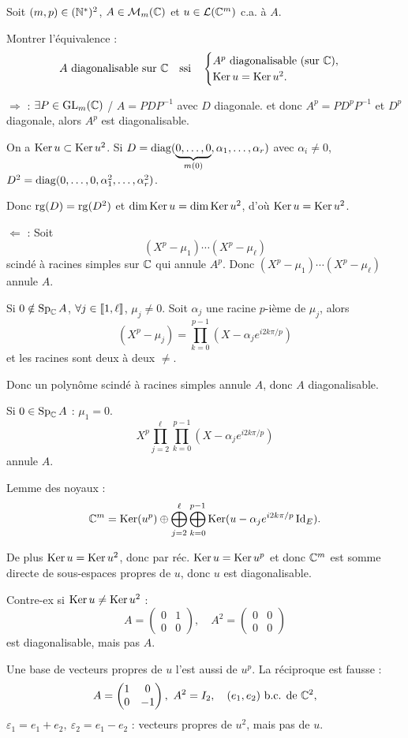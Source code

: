 
\begin{statementbox}
Soit $(m,p)\in(\mathbb N^*)^2$, $A\in\mathcal M_m(\mathbb C)$ et $u\in\mathcal L(\mathbb C^m)$ c.a. à $A$.

Montrer l'équivalence :
\[
A\text{ diagonalisable sur }\mathbb C
\quad\text{ssi}\quad
\begin{cases}
A^p\text{ diagonalisable (sur }\mathbb C),\\
\operatorname{Ker} u=\operatorname{Ker} u^2.
\end{cases}
\]
\end{statementbox}

\begin{solution}
$\Rightarrow$ : $\exists P\in\operatorname{GL}_m(\mathbb C)$ / $A=PDP^{-1}$ avec $D$ diagonale.
et donc $A^p=PD^pP^{-1}$ et $D^p$ diagonale, alors $A^p$ est diagonalisable.

On a $\operatorname{Ker} u\subset\operatorname{Ker} u^2$.
Si $D=\operatorname{diag}(\underbrace{0,\dots,0}_{m(0)},\alpha_1,\dots,\alpha_r)$ avec
$\alpha_i\neq0$, $D^2=\operatorname{diag}(0,\dots,0,\alpha_1^2,\dots,\alpha_r^2)$.

Donc $\operatorname{rg}(D)=\operatorname{rg}(D^2)$ et $\dim\operatorname{Ker} u=\dim\operatorname{Ker} u^2$, d'où
$\operatorname{Ker} u=\operatorname{Ker} u^2$.

$\Leftarrow$ : Soit
\[
(X^p-\mu_1)\cdots(X^p-\mu_\ell)
\]
scindé à racines simples sur $\mathbb C$ qui annule $A^p$.
Donc $(X^p-\mu_1)\cdots(X^p-\mu_\ell)$ annule $A$.

Si $0\notin\operatorname{Sp}_\mathbb C A$, $\forall j\in\llbracket 1,\ell\rrbracket$, $\mu_j\neq0$.
Soit $\alpha_j$ une racine $p$-ième de $\mu_j$, alors
\[
(X^p-\mu_j)=\prod_{k=0}^{p-1}(X-\alpha_j e^{i2k\pi/p})
\]
et les racines sont deux à deux $\neq$.

Donc un polynôme scindé à racines simples annule $A$, donc $A$ diagonalisable.

Si $0\in\operatorname{Sp}_\mathbb C A$ : $\mu_1=0$.
\[
X^p\prod_{j=2}^{\ell}\prod_{k=0}^{p-1}
(X-\alpha_j e^{i2k\pi/p})
\]
annule $A$.

Lemme des noyaux :
\[
\mathbb C^m=\operatorname{Ker}(u^p)\oplus
\bigoplus_{j=2}^{\ell}\bigoplus_{k=0}^{p-1}
\operatorname{Ker}(u-\alpha_je^{i2k\pi/p}\operatorname{Id}_E).
\]

De plus $\operatorname{Ker} u=\operatorname{Ker} u^2$, donc par réc. $\operatorname{Ker} u=\operatorname{Ker} u^p$ et donc $\mathbb C^m$ est
somme directe de sous-espaces propres de $u$, donc $u$ est diagonalisable.

Contre-ex si $\operatorname{Ker} u\neq\operatorname{Ker} u^2$ :
\[
A=\begin{pmatrix}0&1\\0&0\end{pmatrix},\quad
A^2=\begin{pmatrix}0&0\\0&0\end{pmatrix}
\]
est diagonalisable, mais pas $A$.

\begin{remarkbox}
Une base de vecteurs propres de $u$ l'est aussi de $u^p$.
La réciproque est fausse :
\[
A=\begin{pmatrix}1&0\\0&-1\end{pmatrix},\ A^2=I_2,
\quad (e_1,e_2)\text{ b.c. de }\C^2,
\]
$\varepsilon_1=e_1+e_2,\ \varepsilon_2=e_1-e_2$ : vecteurs propres de $u^2$,
mais pas de $u$.
\end{remarkbox}
\end{solution}

